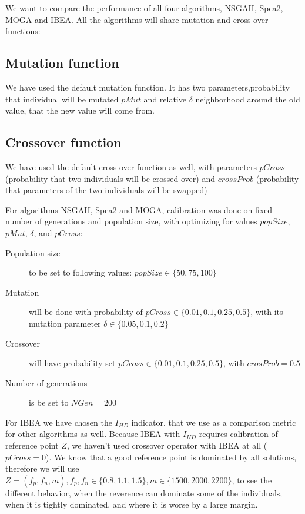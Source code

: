 \documentclass[12pt,oneside]{fithesis2}
\begin{document}
We want to compare the performance of all four algorithms, NSGAII, Spea2, MOGA and IBEA. All the algorithms will share mutation and cross-over functions:

\subsection{Mutation function}
We have used the default mutation function. It has two parameters,probability that individual will be mutated $pMut$ and relative $\delta$ neighborhood around the old value, that the new value will come from.

\subsection{Crossover function}
We have used the default cross-over function as well, with parameters $pCross$ (probability that two individuals will be crossed over) and $crossProb$ (probability that parameters of the two individuals will be swapped)

For algorithms NSGAII, Spea2 and MOGA, calibration was done on fixed number of generations and population size, with optimizing for values $popSize$, $pMut$, $\delta$, and $pCross$:

\begin{description}
  \item[Population size] to be set to following values: $popSize \in \{50,75,100\}$
\item[Mutation] will be done with probability of $pCross \in \{0.01,0.1,0.25,0.5\}$, with its mutation parameter $\delta \in \{0.05,0.1,0.2\}$
\item[Crossover] will have probability set $pCross \in \{0.01,0.1,0.25,0.5\}$, with $crosProb = 0.5$
\item[Number of generations] is be set to $NGen=200$ 
\end{description}

For IBEA we have chosen the $I_{HD}$ indicator, that we use as a comparison metric for other algorithms as well. Because IBEA with $I_{HD}$ requires calibration of reference point $Z$, we haven't used crossover operator with IBEA at all ($pCross=0$). We know that a good reference point is dominated by all solutions, therefore we will use $Z = (f_p,f_n,m), f_p,f_n \in \{0.8,1.1,1.5\}, m \in \{1500,2000,2200\}$, to see the different behavior, when the reverence can dominate some of the individuals, when it is tightly dominated, and where it is worse by a large margin.
\end{document}
